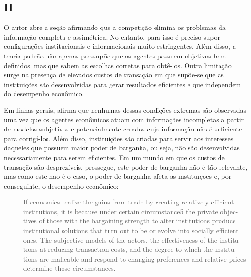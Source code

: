 \subsection{II}

O autor abre a seção afirmando que a competição elimina os problemas da informação completa e assimétrica. No entanto, para isso é preciso supor configurações institucionais e informacionais muito estringentes. Além disso, a teoria-padrão não apenas pressupõe que os agentes possuem objetivos bem definidos, mas que sabem as escolhas corretas para obtê-los. Outra limitação surge na presença de elevados custos de transação em que supõe-se que as instituições são desenvolvidas para gerar resultados eficientes e que independem do desempenho econômico.

Em linhas gerais, \autor afirma que nenhumas dessas condições extremas são observadas uma vez que os agentes econômicos atuam com informações incompletas a partir de modelos subjetivos e potencialmente errados cuja informação não é suficiente para corrigí-los. Além disso, instituições são criadas para servir aos interesses daqueles que possuem maior poder de barganha, ou seja, não são desenvolvidas necessariamente para serem eficientes. Em um mundo em que os custos de transação são desprezíveis, prossegue, este poder de barganha não é tão relevante, mas como este não é o caso, o poder de barganha afeta as instituições e, por conseguinte, o desempenho econômico:

\begin{quotation}
	If economies realize the gains from trade by creating relatively efficient
 institutions, it is because under certain circumstance5 the private objec­tives of those with the bargaining strength to alter institutions produce institutional solutions that turn out to be or evolve into socially efficient ones. The subjective models of the actors, the effectiveness of the institu­tions at reducing transaction costs, and the degree to which the institu­tions are malleable and respond to changing preferences and relative prices determine those circumstances.
\end{quotation}
